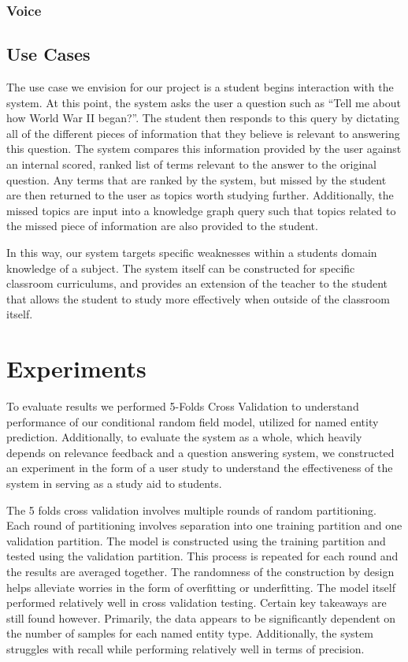 \documentclass[11pt,a4paper]{article}
\begin{document}
\subsubsection{Voice}


\subsection{Use Cases}
The use case we envision for our project is a student begins interaction with the system. At this point, the system asks the user a question such as “Tell me about how World War II began?”. The student then responds to this query by dictating all of the different pieces of information that they believe is relevant to answering this question. The system compares this information provided by the user against an internal scored, ranked list of terms relevant to the answer to the original question. Any terms that are ranked by the system, but missed by the student are then returned to the user as topics worth studying further. Additionally, the missed topics are input into a  knowledge graph query such that topics related to the missed piece of information are also provided to the student.

In this way, our system targets specific weaknesses within a students domain knowledge of a subject. The system itself can be constructed for specific classroom curriculums, and provides an extension of the teacher to the student that allows the student to study more effectively when outside of the classroom itself.  

\section{Experiments}
To evaluate results we performed 5-Folds Cross Validation to understand performance of our conditional random field model, utilized for named entity prediction. Additionally, to evaluate the system as a whole, which heavily depends on relevance feedback and a question answering system, we constructed an experiment in the form of a user study to understand the effectiveness of the system in serving as a study aid to students. 

The 5 folds cross validation involves multiple rounds of random partitioning. Each round of partitioning involves separation into one training partition and one validation partition. The model is constructed using the training partition and tested using the validation partition. This process is repeated for each round and the results are averaged together. The randomness of the construction by design helps alleviate worries in the form of overfitting or underfitting. The model itself performed relatively well in cross validation testing. Certain key takeaways are still found however. Primarily, the data appears to be significantly dependent on the number of samples for each named entity type. Additionally, the system struggles with recall while performing relatively well in terms of precision.
\end{document}
